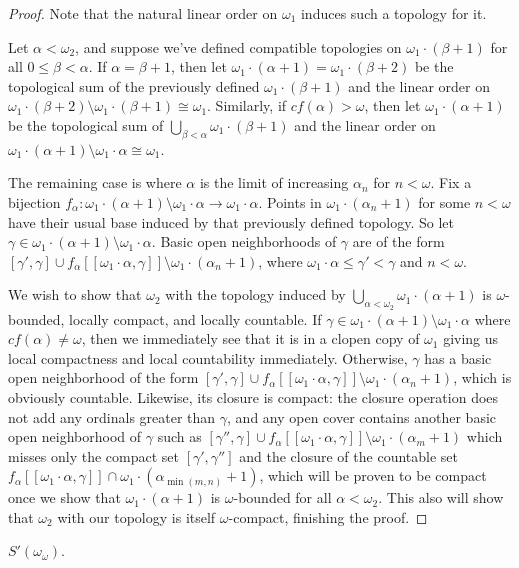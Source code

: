 \documentclass[11pt]{article}
\begin{document}
  \begin{proof}
    Note that the natural linear order on \(\omega_1\) induces such
    a topology for it.

    Let \(\alpha<\omega_2\), and suppose we've defined compatible topologies on
    \(\omega_1\cdot (\beta+1)\) for all \(0\leq\beta<\alpha\).
    If \(\alpha=\beta+1\), then let
    \(\omega_1\cdot(\alpha+1)=\omega_1\cdot(\beta+2)\) be the topological sum
    of the previously defined \(\omega_1\cdot(\beta+1)\) and the linear order
    on \(\omega_1\cdot(\beta+2)\setminus\omega_1\cdot(\beta+1)\cong\omega_1\).
    Similarly, if \(cf(\alpha)>\omega\), then let \(\omega_1\cdot(\alpha+1)\)
    be the topological sum of \(\bigcup_{\beta<\alpha}\omega_1\cdot(\beta+1)\)
    and the linear order on
    \(\omega_1\cdot(\alpha+1)\setminus\omega_1\cdot\alpha\cong\omega_1\).

    The remaining case is where \(\alpha\) is the limit of increasing
    \(\alpha_n\) for \(n<\omega\). Fix a bijection
    \(
      f_\alpha
        :
      \omega_1\cdot(\alpha+1)\setminus\omega_1\cdot\alpha
        \to
      \omega_1\cdot\alpha
    \). Points in \(\omega_1\cdot(\alpha_n+1)\) for some \(n<\omega\)
    have their usual base induced by that previously defined topology. So let
    \(\gamma\in\omega_1\cdot(\alpha+1)\setminus\omega_1\cdot\alpha\).
    Basic open neighborhoods of \(\gamma\) are of the form
    \(
      [\gamma',\gamma]
        \cup
      f_\alpha[[\omega_1\cdot\alpha,\gamma]]
        \setminus
      \omega_1\cdot(\alpha_n+1)
    \),
    where \(\omega_1\cdot\alpha\leq\gamma'<\gamma\)
    and \(n<\omega\).

    We wish to show that \(\omega_2\) with the topology induced by
    \(\bigcup_{\alpha<\omega_2}\omega_1\cdot(\alpha+1)\) is \(\omega\)-bounded,
    locally compact, and locally countable. If
    \(\gamma\in\omega_1\cdot(\alpha+1)\setminus\omega_1\cdot\alpha\) where
    \(cf(\alpha)\not=\omega\), then we immediately see that it is in a clopen
    copy of \(\omega_1\) giving us local compactness and local countability
    immediately. Otherwise, \(\gamma\) has a basic open neighborhood of the form
    \(
      [\gamma',\gamma]
        \cup
      f_\alpha[[\omega_1\cdot\alpha,\gamma]]
        \setminus
      \omega_1\cdot(\alpha_n+1)
    \),
    which is obviously countable. Likewise, its closure is compact:
    the closure operation does not add any ordinals greater than \(\gamma\),
    and any open cover
    contains another basic open neighborhood of \(\gamma\) such as
    \(
      [\gamma'',\gamma]
        \cup
      f_\alpha[[\omega_1\cdot\alpha,\gamma]]
        \setminus
      \omega_1\cdot(\alpha_m+1)
    \)
    which misses only the compact set \([\gamma',\gamma'']\) and the
    closure of the countable set
    \(
      f_\alpha[[\omega_1\cdot\alpha,\gamma]]
        \cap
      \omega_1\cdot(\alpha_{\min(m,n)}+1)
    \), which will be proven to be compact once we show that
    \(\omega_1\cdot(\alpha+1)\) is \(\omega\)-bounded for all
    \(\alpha<\omega_2\). This also will show that \(\omega_2\) with our
    topology is itself \(\omega\)-compact, finishing the proof.


  \end{proof}

  \begin{theorem*}
    \(S'(\omega_\omega)\).
  \end{theorem*}
\end{document}
